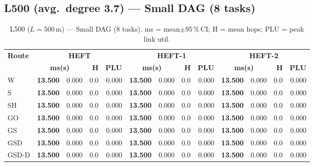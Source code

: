 \documentclass[11pt]{article}
\newcommand{\win}[1]{\textcolor{green!50!black}{\textbf{#1}}}
\begin{document}
\subsection{L500 (avg.\ degree 3.7) --- Small DAG (8 tasks)}
\begin{table}[H]\centering\small
\begin{tabular}{l r@{$\pm$}l r r r@{$\pm$}l r r r@{$\pm$}l r r}
\toprule
\textbf{Route} & \multicolumn{4}{c}{\textbf{HEFT}} & \multicolumn{4}{c}{\textbf{HEFT-1}} & \multicolumn{4}{c}{\textbf{HEFT-2}} \\
\cmidrule(lr){2-5}\cmidrule(lr){6-9}\cmidrule(lr){10-13}
& \multicolumn{2}{c}{\textbf{ms(s)}} & \textbf{H} & \textbf{PLU}& \multicolumn{2}{c}{\textbf{ms(s)}} & \textbf{H} & \textbf{PLU}& \multicolumn{2}{c}{\textbf{ms(s)}} & \textbf{H} & \textbf{PLU} \\
\midrule
  W & \win{13.500} & 0.000 & 0.0 & 0.000 & \win{13.500} & 0.000 & 0.0 & 0.000 & \win{13.500} & 0.000 & 0.0 & 0.000 \\
  S & \win{13.500} & 0.000 & 0.0 & 0.000 & \win{13.500} & 0.000 & 0.0 & 0.000 & \win{13.500} & 0.000 & 0.0 & 0.000 \\
  SH & \win{13.500} & 0.000 & 0.0 & 0.000 & \win{13.500} & 0.000 & 0.0 & 0.000 & \win{13.500} & 0.000 & 0.0 & 0.000 \\
  GO & \win{13.500} & 0.000 & 0.0 & 0.000 & \win{13.500} & 0.000 & 0.0 & 0.000 & \win{13.500} & 0.000 & 0.0 & 0.000 \\
  GS & \win{13.500} & 0.000 & 0.0 & 0.000 & \win{13.500} & 0.000 & 0.0 & 0.000 & \win{13.500} & 0.000 & 0.0 & 0.000 \\
  GSD & \win{13.500} & 0.000 & 0.0 & 0.000 & \win{13.500} & 0.000 & 0.0 & 0.000 & \win{13.500} & 0.000 & 0.0 & 0.000 \\
  GSD-D & \win{13.500} & 0.000 & 0.0 & 0.000 & \win{13.500} & 0.000 & 0.0 & 0.000 & \win{13.500} & 0.000 & 0.0 & 0.000 \\
\bottomrule\end{tabular}
\caption{L500 ($L=500$\,m) --- Small DAG (8 tasks). ms = mean$\pm$95\,\%\,CI; H = mean hops; PLU = peak link util.}
\end{table}
\end{document}
